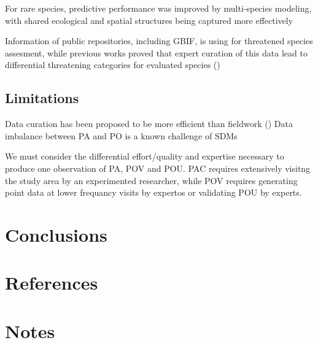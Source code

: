 \documentclass{article}
\begin{document}
For rare species, predictive performance was improved by multi-species modeling, with shared ecological and spatial structures being captured more effectively \cite{Datafusion2025}

Information of public repositories, including GBIF, is using for threatened species assesment, while previous works proved that expert curation of this data lead to differential threatening categories for evaluated species (\cite{panter2020clean})

\subsection{Limitations}

Data curation has been proposed to be more efficient than fieldwork ()
Data imbalance between PA and PO is a known challenge of SDMs \cite{Grattarola2023}

We must consider the differential effort/quality and expertise necessary to produce one observation of PA, POV and POU. PAC requires extensively visitng the study area by an experimented researcher, while POV requires generating point data at lower frequancy visits by expertos or validating POU by experts. 

\section{Conclusions}

\section{References}



\section{Notes}
\end{document}
